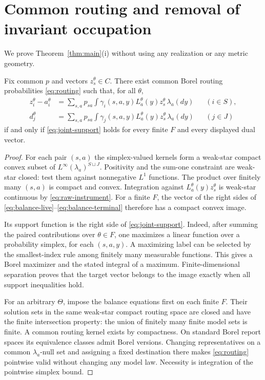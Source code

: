 \section{Common routing and removal of invariant occupation}\label{sec:occupation-proof}
We prove Theorem~\ref{thm:main}(i) without using any realization or any metric geometry.

\begin{lemma}\label{lem:routing}
Fix common $p$ and vectors $z_s^\theta\in C$. There exist common Borel routing probabilities \eqref{eq:routing} such that, for all $\theta$,
\begin{align}
 z_i^\theta-a_i^\theta
  &=\sum_{s,a}p_{sa}\int\gamma_i(s,a,y)L_a^\theta(y)z_s^\theta\,\lambda_a(dy)
       &&(i\in S),\label{eq:balance-live}\\
 d_j^\theta
  &=\sum_{s,a}p_{sa}\int\gamma_j(s,a,y)L_a^\theta(y)z_s^\theta\,\lambda_a(dy)
       &&(j\in J)\label{eq:balance-terminal}
\end{align}
if and only if \eqref{eq:joint-support} holds for every finite $F$ and every displayed dual vector.
\end{lemma}
\begin{proof}
For each pair $(s,a)$ the simplex-valued kernels form a weak-star compact convex subset of $L^\infty(\lambda_a)^{S\sqcup J}$. Positivity and the sum-one constraint are weak-star closed: test them against nonnegative $L^1$ functions. The product over finitely many $(s,a)$ is compact and convex. Integration against $L_a^\theta(y)z_s^\theta$ is weak-star continuous by \eqref{eq:raw-instrument}. For a finite $F$, the vector of the right sides of \eqref{eq:balance-live}--\eqref{eq:balance-terminal} therefore has a compact convex image.

Its support function is the right side of \eqref{eq:joint-support}. Indeed, after summing the paired contributions over $\theta\in F$, one maximizes a linear function over a probability simplex, for each $(s,a,y)$. A maximizing label can be selected by the smallest-index rule among finitely many measurable functions. This gives a Borel maximizer and the stated integral of a maximum. Finite-dimensional separation proves that the target vector belongs to the image exactly when all support inequalities hold.

For an arbitrary $\Theta$, impose the balance equations first on each finite $F$. Their solution sets in the same weak-star compact routing space are closed and have the finite intersection property: the union of finitely many finite model sets is finite. A common routing kernel exists by compactness. On standard Borel report spaces its equivalence classes admit Borel versions. Changing representatives on a common $\lambda_a$-null set and assigning a fixed destination there makes \eqref{eq:routing} pointwise valid without changing any model law. Necessity is integration of the pointwise simplex bound.
\end{proof}

